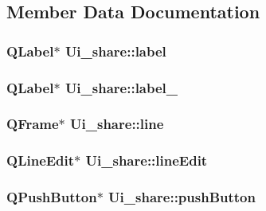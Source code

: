 \subsection{Member Data Documentation}
\hypertarget{classUi__share_a0f9cf6700cc03d94e92184ec00d6d779}{
\subsubsection[{label}]{\setlength{\rightskip}{0pt plus 5cm}Q\-Label$\ast$ Ui\-\_\-share\-::label}}\label{classUi__share_a0f9cf6700cc03d94e92184ec00d6d779}
\hypertarget{classUi__share_adc2e30dbe8a3a183ad5f36572ebd34ce}{
\subsubsection[{label\-\_\-2}]{\setlength{\rightskip}{0pt plus 5cm}Q\-Label$\ast$ Ui\-\_\-share\-::label\-\_}}\label{classUi__share_adc2e30dbe8a3a183ad5f36572ebd34ce}
\hypertarget{classUi__share_a4a05f72319c50150af03019e85b5e7d8}{
\subsubsection[{line}]{\setlength{\rightskip}{0pt plus 5cm}Q\-Frame$\ast$ Ui\-\_\-share\-::line}}\label{classUi__share_a4a05f72319c50150af03019e85b5e7d8}
\hypertarget{classUi__share_a9ac12497ba78acac793f9f7bbad0d7d8}{
\subsubsection[{line\-Edit}]{\setlength{\rightskip}{0pt plus 5cm}Q\-Line\-Edit$\ast$ Ui\-\_\-share\-::line\-Edit}}\label{classUi__share_a9ac12497ba78acac793f9f7bbad0d7d8}
\hypertarget{classUi__share_ad2a9acf7a35cdbebe7ed5e3a74dcf537}{
\subsubsection[{push\-Button}]{\setlength{\rightskip}{0pt plus 5cm}Q\-Push\-Button$\ast$ Ui\-\_\-share\-::push\-Button}}\label{classUi__share_ad2a9acf7a35cdbebe7ed5e3a74dcf537}

